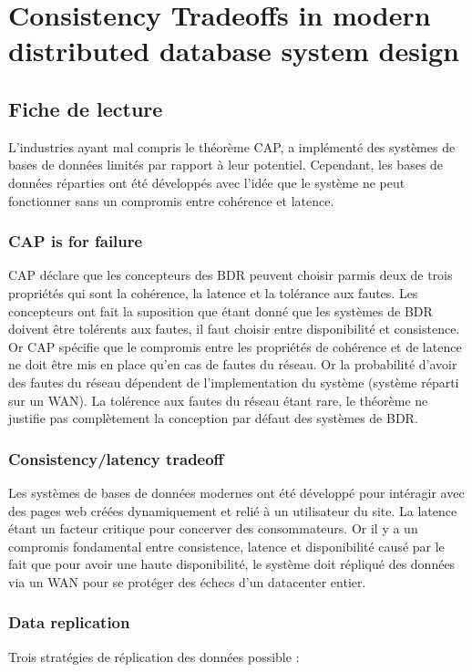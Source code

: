 \section{Consistency Tradeoffs in modern distributed database system design}

\subsection {Fiche de lecture}

L'industries ayant mal compris le théorème CAP, a implémenté des systèmes de bases de données limités par rapport à leur potentiel.
Cependant, les bases de données réparties ont été développés avec l'idée que le système ne peut fonctionner sans un compromis entre cohérence et latence.

\subsubsection{CAP is for failure}
CAP déclare que les concepteurs des BDR peuvent choisir parmis deux de trois propriétés qui sont la cohérence, la latence et la tolérance aux fautes.
Les concepteurs ont fait la suposition que étant donné que les systèmes de BDR doivent être tolérents aux fautes, il faut choisir entre disponibilité et consistence.
Or CAP spécifie que le compromis entre les propriétés de cohérence et de latence ne doit être mis en place qu'en cas de fautes du réseau. Or la probabilité d'avoir des fautes du réseau dépendent de l'implementation du système (système réparti sur un WAN). La tolérence aux fautes du réseau étant rare, le théorème ne justifie pas complètement la conception par défaut des systèmes de BDR.

\subsubsection{Consistency/latency tradeoff}
Les systèmes de bases de données modernes ont été développé pour intéragir avec des pages web créées dynamiquement et relié à un utilisateur du site. La latence étant un facteur critique pour concerver des consommateurs.
Or il y a un compromis fondamental entre consistence, latence et disponibilité causé par le fait que pour avoir une haute disponibilité, le système doit répliqué des données via un WAN pour se protéger des échecs d'un datacenter entier.

\subsubsection{Data replication}
Trois stratégies de réplication des données possible :

